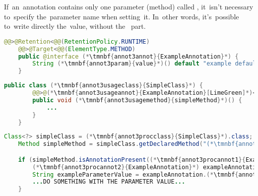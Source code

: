 \label{javaannotationparamvalue}
If~an~annotation contains only one parameter (method) called , it~isn't necessary to~specify the~parameter name when setting~it.
In~other words, it's~possible to~write directly the~value, without \mbox{the } part.

\example
\begin{lstlisting}[language=Java, title={Annotation with single parameter called \itq{value}}]
    @@>@Retention<@@(RetentionPolicy.RUNTIME)
    @@>@Target<@@(ElementType.METHOD)
    public @interface (*\tmnbf{annot3annot}{ExampleAnnotation}*) {
        String (*\tmnbf{annot3param}{value}*)() default "example default value";
    }
\end{lstlisting}
\begin{lstlisting}[language=Java, title={Setting the~parameter value~--~no~need to~write \mbitq{value = }}]
    public class (*\tmnbf{annot3usageclass}{SimpleClass}*) {
        @@>@(*\tmnbf{annot3usageannot}{ExampleAnnotation}[LimeGreen]*)<@@("new value")
        public void (*\tmnbf{annot3usagemethod}{simpleMethod}*)() {
            ...
        }
    }
\end{lstlisting}
\begin{lstlisting}[language=Java, title={Runtime annotation processing}]
    Class<?> simpleClass = (*\tmnbf{annot3procclass}{SimpleClass}*).class;
    Method simpleMethod = simpleClass.getDeclaredMethod("(*\tmnbf{annot3procmethod}{simpleMethod}[ForestGreen]*)");

    if (simpleMethod.isAnnotationPresent((*\tmnbf{annot3procannot1}{ExampleAnnotation}*).class)) {
        (*\tmnbf{annot3procannot2}{ExampleAnnotation}*) exampleAnnotation = simpleMethod.getAnnotation((*\tmnbf{annot3procannot3}{ExampleAnnotation}*).class);
        String exampleParameterValue = exampleAnnotation.(*\tmnbf{annot3procparam}{value}*)();
        ...DO SOMETHING WITH THE PARAMETER VALUE...
    }
\end{lstlisting}
\newpage

